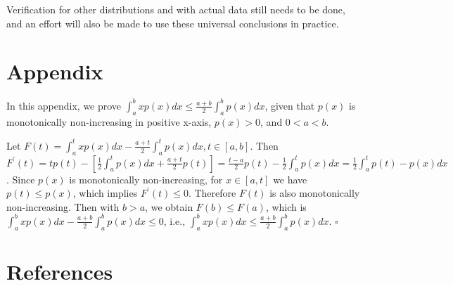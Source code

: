 \documentclass[smallabstract,smallcaptions]{dccpaper}
\begin{document}
Verification for other distributions and with actual data still needs to be done, and an effort will also be made to use these universal conclusions in practice.

\section*{Appendix}
\label{sec:appendix}

In this appendix, we prove $\int_a^b xp(x)dx \le \frac{a+b}{2} \int_a^b p(x)dx$, given that $p(x)$ is monotonically non-increasing in positive x-axis, $p(x) > 0$, and $0 < a < b$.

Let $F(t) = \int_a^t xp(x)dx - \frac{a+t}{2} \int_a^t p(x)dx, t \in [a, b]$. Then $F^{\prime}(t) = tp(t) - [\frac{1}{2}\int_a^t p(x)dx + \frac{a+t}{2}p(t)] = \frac{t-a}{2}p(t) - \frac{1}{2}\int_a^t p(x)dx = \frac{1}{2}\int_a^t p(t)-p(x)dx $. Since $p(x)$ is monotonically non-increasing, for $x \in [a, t]$ we have $p(t) \le p(x)$, which implies $F^{\prime}(t) \le 0$. Therefore $F(t)$ is also monotonically non-increasing. Then with $b > a$, we obtain $F(b) \le F(a)$, which is $\int_a^b xp(x)dx - \frac{a+b}{2} \int_a^b p(x)dx \le 0$, i.e., $\int_a^b xp(x)dx \le \frac{a+b}{2} \int_a^b p(x)dx$. $\square$

\section*{References}


\end{document}
